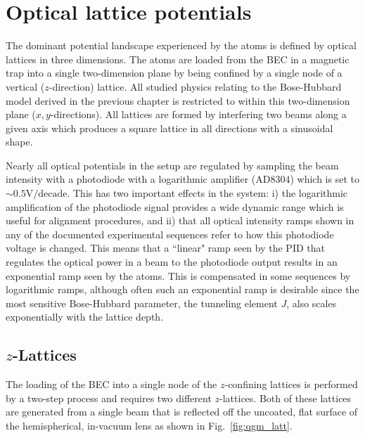 \section{Optical lattice potentials}

The dominant potential landscape experienced by the atoms is defined by optical lattices in three dimensions. The atoms are loaded from the BEC in a magnetic trap into a single two-dimension plane by being confined by a single node of a vertical ($z$-direction) lattice. All studied physics relating to the Bose-Hubbard model derived in the previous chapter is restricted to within this two-dimension plane ($x,y$-directions). All lattices are formed by interfering two beams along a given axis which produces a square lattice in all directions with a sinusoidal shape.

Nearly all optical potentials in the setup are regulated by sampling the beam intensity with a photodiode with a logarithmic amplifier (AD$8304$) which is set to $\sim 0.5\text{V/decade}$. This has two important effects in the system: i) the logarithmic amplification of the photodiode signal provides a wide dynamic range which is useful for alignment procedures, and ii) that all optical intensity ramps shown in any of the documented experimental sequences refer to how this photodiode voltage is changed. This means that a ``linear" ramp seen by the PID that regulates the optical power in a beam to the photodiode output results in an exponential ramp seen by the atoms. This is compensated in some sequences by logarithmic ramps, although often such an exponential ramp is desirable since the most sensitive Bose-Hubbard parameter, the tunneling element $J$, also scales exponentially with the lattice depth.

\subsection{$z$-Lattices}
\label{sec:zlatt}

The loading of the BEC into a single node of the $z$-confining lattices is performed by a two-step process and requires two different $z$-lattices. Both of these lattices are generated from a single beam that is reflected off the uncoated, flat surface of the hemispherical, in-vacuum lens as shown in Fig.~\ref{fig:qgm_latt}. 

